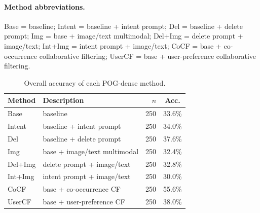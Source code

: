 






\paragraph{Method abbreviations.} Base = baseline; Intent = baseline + intent prompt; Del = baseline + delete prompt; Img = base + image/text multimodal; Del+Img = delete prompt + image/text; Int+Img = intent prompt + image/text; CoCF = base + co-occurrence collaborative filtering; UserCF = base + user-preference collaborative filtering.



\begin{table}[t]
\centering
\small
\caption{Overall accuracy of each POG-dense method.}
\label{tab:overall-method-acc}
\begin{tabular}{l l r c}
\toprule
Method & Description & $n$ & Acc. \\
\midrule
Base & baseline & 250 & 33.6\% \\
Intent & baseline + intent prompt & 250 & 34.0\% \\
Del & baseline + delete prompt & 250 & 37.6\% \\
Img & base + image/text multimodal & 250 & 32.4\% \\
Del+Img & delete prompt + image/text & 250 & 32.8\% \\
Int+Img & intent prompt + image/text & 250 & 30.0\% \\
CoCF & base + co-occurrence CF & 250 & 55.6\% \\
UserCF & base + user-preference CF & 250 & 38.0\% \\
\bottomrule
\end{tabular}
\end{table}

\FloatBarrier



